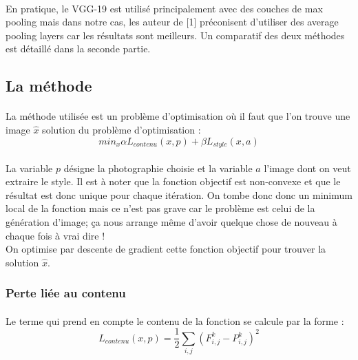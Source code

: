 \documentclass{article}
\begin{document}
\paragraph*{}
En pratique, le VGG-19 est utilisé principalement avec des couches de max pooling mais dans notre cas, les auteur de [1] préconisent d'utiliser des average pooling layers car les résultats sont meilleurs. Un comparatif des deux méthodes est détaillé dans la seconde partie.

\subsection*{La méthode}
\paragraph*{}
La méthode utilisée est un problème d'optimisation où il faut que l'on trouve une image $\hat x$ solution du problème d'optimisation :
\begin{equation}
min_x \alpha L_{contenu}(x, p) + \beta L_{style}(x, a)
\end{equation} 
\paragraph*{}
La variable $p$ désigne la photographie choisie et la variable $a$ l'image dont on veut extraire le style. Il est à noter que la fonction objectif est non-convexe et que le résultat est donc unique pour chaque itération. On tombe donc donc un minimum local de la fonction mais ce n'est pas grave car le problème est celui de la génération d'image; ça nous arrange même d'avoir quelque chose de nouveau à chaque fois à vrai dire !\\
On optimise par descente de gradient cette fonction objectif pour trouver la solution $\hat x$.

\subsubsection*{Perte liée au contenu}
\paragraph*{}
Le terme qui prend en compte le contenu de la fonction se calcule par la forme :
\begin{equation}
L_{contenu}(x,p) = \frac{1}{2} \sum_{i,j}(F_{i,j}^k-P_{i,j}^k)^2
\end{equation}
\end{document}
